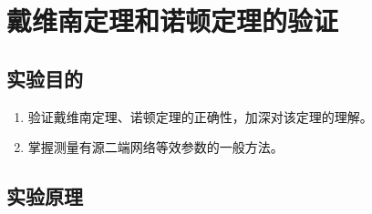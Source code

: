 \documentclass[UTF8]{article}
\begin{document}
    \section{戴维南定理和诺顿定理的验证}
        \subsection{实验目的}
            \begin{enumerate}[label=\textbf{\arabic*}.]
                \item 验证戴维南定理、诺顿定理的正确性，加深对该定理的理解。 
                \item 掌握测量有源二端网络等效参数的一般方法。
            \end{enumerate}
        \subsection{实验原理}
\end{document}
